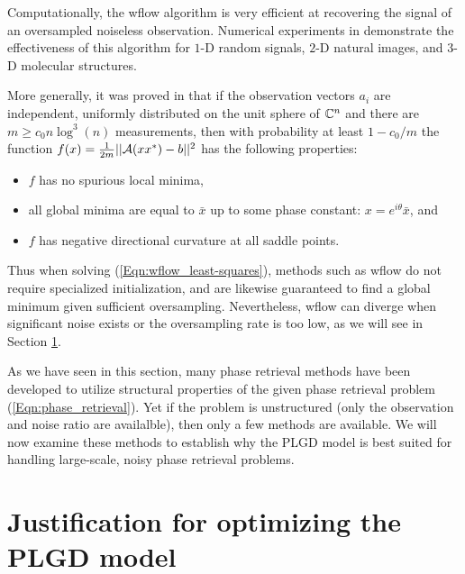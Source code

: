 Computationally, the wflow algorithm is very efficient at recovering the signal of an oversampled noiseless observation.  Numerical experiments in \cite[Section 4]{DBLP:journals/tit/CandesLS15} demonstrate the effectiveness of this algorithm for $1$-D random signals, $2$-D natural images, and $3$-D molecular structures.  


More generally, it was proved in \cite{sun2016geometric} that if the observation vectors $a_i$ are independent, uniformly distributed on the unit sphere of ${\mathbb C}^n$ and there are $m \geq c_0 n \log^3(n)$ measurements, then with probability at least $1-c_0/m$ the function $f(x) = \frac{1}{2m}||{\mathcal A}(xx^*) - b||^2$ has the following properties:

\begin{itemize} 		

\item 
$f$ has no spurious local minima,

\item
all global minima are equal to $\bar{x}$ up to some phase constant: $x = e^{i \theta}\bar{x}$, and

\item
$f$ has negative directional curvature at all saddle points.

\end{itemize}

Thus when solving (\ref{Eqn:wflow_least-squares}), methods such as wflow do not require specialized initialization, and are likewise guaranteed to find a global minimum given sufficient oversampling.  Nevertheless, wflow can diverge when significant noise exists or the oversampling rate is too low, as we will see in Section \ref{Subsec:phase_retrieval-why_optimize_PLGD_model}.


As we have seen in this section, many phase retrieval methods have been developed to utilize structural properties of the given phase retrieval problem (\ref{Eqn:phase_retrieval}).  Yet if the problem is unstructured (only the observation and noise ratio are availalble), then only a few methods are available.   We will now examine these methods to establish why the PLGD model is best suited for handling large-scale, noisy phase retrieval problems.




\section{Justification for optimizing the PLGD model}	\label{Subsec:phase_retrieval-why_optimize_PLGD_model}




